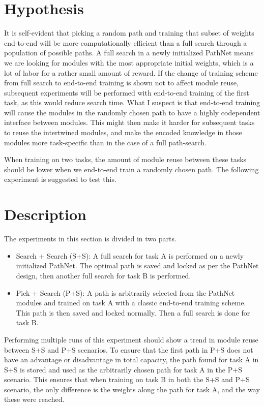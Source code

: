 \section{Hypothesis}
It is self-evident that picking a random path and training that subset of weights end-to-end will be more computationally efficient than a full search through a population of possible paths. A full search in a newly initialized PathNet means we are looking for modules with the most appropriate initial weights, which is a lot of labor for a rather small amount of reward. If the change of training scheme from full search to end-to-end training is shown not to affect module reuse, subsequent experiments will be performed with end-to-end training of the first task, as this would reduce search time. What I suspect is that end-to-end training will cause the modules in the randomly chosen path to have a highly codependent interface between modules. This might then make it harder for subsequent tasks to reuse the intertwined modules, and make the encoded knowledge in those modules more task-specific than in the case of a full path-search. 

When training on two tasks, the amount of module reuse between these tasks should be lower when we end-to-end train a randomly chosen path. The following experiment is suggested to test this. 

\section{Description}
The experiments in this section is divided in two parts. 
\begin{itemize}
    \item Search + Search (S+S): A full search for task A is performed on a newly initialized PathNet. The optimal path is saved and locked as per the PathNet design, then another full search for task B is performed.
    \item Pick + Search (P+S): A path is arbitrarily selected from the PathNet modules and trained on task A with a classic end-to-end training scheme. This path is then saved and locked normally. Then a full search is done for task B.
\end{itemize}
Performing multiple runs of this experiment should show a trend in module reuse between S+S and P+S scenarios. To ensure that the first path in P+S does not have an advantage or disadvantage in total capacity,  the path found for task A in S+S is stored and used as the arbitrarily chosen path for task A in the P+S scenario. This ensures that when training on task B in both the S+S and P+S scenario, the only difference is the weights along the path for task A, and the way these were reached. 


